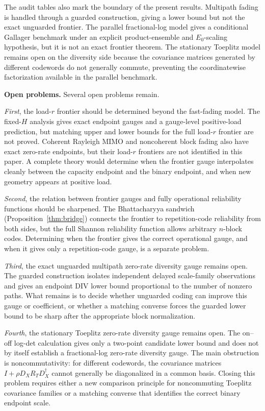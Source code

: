 \documentclass[lettersize,onecolumn]{IEEEtran}
\newcommand{\snr}{\rho}
\begin{document}
The audit tables also mark the boundary of the present results.
Multipath fading is handled through a guarded construction, giving a
lower bound but not the exact unguarded frontier. The parallel
fractional-log model gives a conditional Gallager benchmark under an
explicit product-ensemble and $E_0$-scaling hypothesis, but it is not
an exact frontier theorem. The stationary Toeplitz model remains open
on the diversity side because the covariance matrices generated by
different codewords do not generally commute, preventing the
coordinatewise factorization available in the parallel benchmark.

\textbf{Open problems.}
Several open problems remain.

\emph{First}, the load-$r$ frontier should be determined beyond the
fast-fading model. The fixed-$H$ analysis gives exact endpoint gauges
and a gauge-level positive-load prediction, but matching upper and
lower bounds for the full load-$r$ frontier are not proved. Coherent
Rayleigh MIMO and noncoherent block fading also have exact zero-rate
endpoints, but their load-$r$ frontiers are not
identified in this paper. A complete theory would determine when the
frontier gauge interpolates cleanly between the capacity endpoint and
the binary endpoint, and when new geometry appears at positive load.

\emph{Second}, the relation between frontier gauges and fully
operational reliability functions should be sharpened. The
Bhattacharyya sandwich (Proposition~\ref{thm:bridge}) connects the
frontier to repetition-code reliability from both sides, but
the full Shannon reliability function allows arbitrary $n$-block
codes. Determining when the frontier gives the correct operational
gauge, and when it gives only a repetition-code gauge, is a separate
problem.

\emph{Third}, the exact unguarded multipath zero-rate diversity gauge remains
open. The guarded construction isolates independent delayed
scale-family observations and gives an endpoint DIV lower bound
proportional to the number of nonzero paths. What remains is to
decide whether unguarded coding can improve this gauge or coefficient,
or whether a matching converse forces the guarded lower bound to be
sharp after the appropriate block normalization.

\emph{Fourth}, the stationary Toeplitz zero-rate diversity gauge
remains open. The on--off log-det calculation gives only a two-point
candidate lower bound and does not by itself establish a
fractional-log zero-rate diversity gauge. The main obstruction is
noncommutativity: for different codewords, the covariance matrices
$I + \snr D_X R_T D_X^\dagger$ cannot generally be diagonalized in a
common basis. Closing this problem requires either a new comparison
principle for noncommuting Toeplitz covariance families or a matching
converse that identifies the correct binary endpoint scale.
\end{document}

